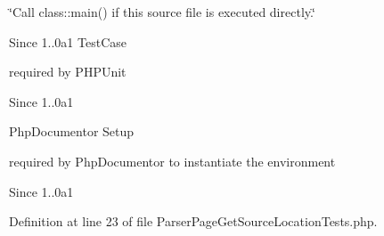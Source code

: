 \char`\"{}\-Call class\-::main() if this source file is executed directly.\char`\"{} \begin{DoxySince}{\-Since}
1..\-0a1 \-Test\-Case
\end{DoxySince}
required by \-P\-H\-P\-Unit \begin{DoxySince}{\-Since}
1..\-0a1
\end{DoxySince}
\-Php\-Documentor \-Setup

required by \-Php\-Documentor to instantiate the environment \begin{DoxySince}{\-Since}
1..\-0a1 
\end{DoxySince}


\-Definition at line 23 of file \-Parser\-Page\-Get\-Source\-Location\-Tests.\-php.

